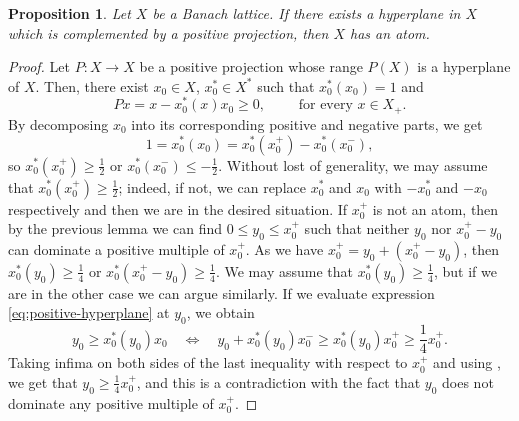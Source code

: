 \documentclass[11pt]{amsart}
\newtheorem{prop}[thm]{Proposition}
\theoremstyle{definition}
\numberwithin{equation}{section}
\begin{document}
\begin{prop}\label{prop:hyperplanepositiveprojection}
Let $X$ be a Banach lattice. If there exists a hyperplane in $X$ which is complemented by a positive projection, then $X$ has an atom.   
\end{prop}

\begin{proof}
Let $P:X\to X$ be a positive projection whose range $P(X)$ is a hyperplane of $X$. Then, there exist $x_0\in X$, $x_0^*\in X^*$ such that $x_0^*(x_0)=1$ and
\begin{equation}\label{eq:positive-hyperplane}
 Px=x-x_0^*(x)x_0\geq 0, \qquad \text{ for every } x\in X_+.   
\end{equation}
By decomposing $x_0$ into its corresponding positive and negative parts, we get
\begin{equation*}
    1=x^*_0(x_0)=x_0^*(x_0^+)-x_0^*(x_0^-),
\end{equation*}
so $x_0^*(x_0^+)\geq \frac{1}{2}$ or $x_0^*(x_0^-)\leq -\frac{1}{2}$. Without lost of generality, we may assume that $x_0^*(x_0^+)\geq \frac{1}{2}$; indeed, if not, we can replace $x_0^*$ and $x_0$ with $-x_0^*$ and $-x_0$ respectively and then we are in the desired situation. If $x_0^+$ is not an atom, then by the previous lemma we can find $0\leq y_0\leq x_0^+$ such that neither $y_0$ nor $x_0^+-y_0$ can dominate a positive multiple of $x_0^+$. As we have $x_0^+=y_0+(x_0^+-y_0)$, then $x_0^*(y_0)\geq \frac{1}{4}$ or $x_0^*(x_0^+-y_0)\geq \frac{1}{4}$. We may assume that $x_0^*(y_0)\geq \frac{1}{4}$, but if we are in the other case we can argue similarly. If we evaluate expression \eqref{eq:positive-hyperplane} at $y_0$, we obtain
$$
y_0\geq x_0^*(y_0)x_0 \quad \Longleftrightarrow \quad y_0+x_0^*(y_0)x_0^-\geq x_0^*(y_0)x_0^+\geq \frac{1}{4}x_0^+.
$$
Taking infima on both sides of the last inequality with respect to $x_0^+$ and using \cite[Theorem 1.1.1 (ix)]{M-N-book}, we get that $y_0\geq \frac{1}{4}x_0^+$, and this is a contradiction with the fact that $y_0$ does not dominate any positive multiple of $x_0^+$.

\end{proof}
\end{document}
